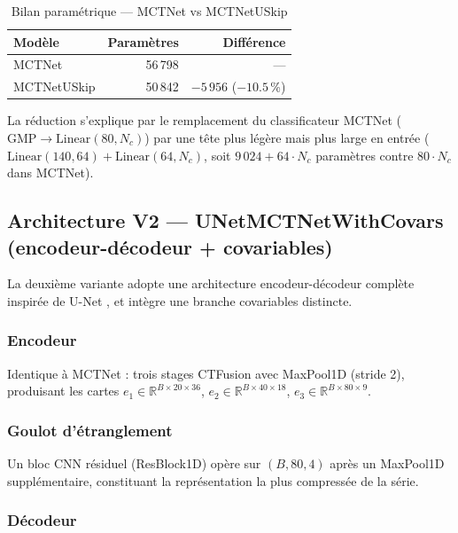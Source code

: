 \begin{table}[H]
\centering
\caption{Bilan paramétrique — MCTNet vs MCTNetUSkip}
\label{tab:params_uskip}
\begin{tabular}{lrr}
\toprule
\textbf{Modèle} & \textbf{Paramètres} & \textbf{Différence} \\
\midrule
MCTNet       & 56\,798 & --- \\
MCTNetUSkip  & 50\,842 & $-5\,956$ ($-10.5$\,\%) \\
\bottomrule
\end{tabular}
\end{table}

\noindent
La réduction s'explique par le remplacement du classificateur MCTNet
($\text{GMP} \to \text{Linear}(80, N_c)$) par une tête plus légère mais plus
large en entrée ($\text{Linear}(140,64) + \text{Linear}(64,N_c)$, soit
$9\,024 + 64 \cdot N_c$ paramètres contre $80 \cdot N_c$ dans MCTNet).

\subsection{Architecture V2 — UNetMCTNetWithCovars (encodeur-décodeur + covariables)}
\label{subsec:uskip_v2}

La deuxième variante adopte une architecture encodeur-décodeur complète
inspirée de U-Net \cite{ronneberger2015}, et intègre une branche covariables
distincte.

\subsubsection{Encodeur}

Identique à MCTNet : trois stages CTFusion avec MaxPool1D (stride 2),
produisant les cartes $e_1 \in \mathbb{R}^{B\times 20 \times 36}$,
$e_2 \in \mathbb{R}^{B\times 40 \times 18}$,
$e_3 \in \mathbb{R}^{B\times 80 \times 9}$.

\subsubsection{Goulot d'étranglement}

Un bloc CNN résiduel (ResBlock1D) opère sur $(B, 80, 4)$ après un MaxPool1D
supplémentaire, constituant la représentation la plus compressée de la série.

\subsubsection{Décodeur}

